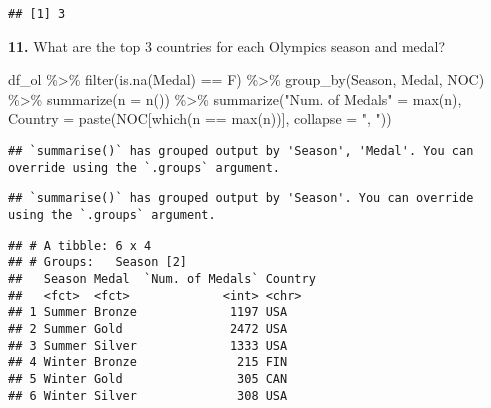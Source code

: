 \documentclass[
]{article}
\newenvironment{Shaded}{\begin{snugshade}}{\end{snugshade}}
\newcommand{\AttributeTok}[1]{\textcolor[rgb]{0.77,0.63,0.00}{#1}}
\newcommand{\FunctionTok}[1]{\textcolor[rgb]{0.00,0.00,0.00}{#1}}
\newcommand{\NormalTok}[1]{#1}
\newcommand{\OtherTok}[1]{\textcolor[rgb]{0.56,0.35,0.01}{#1}}
\newcommand{\SpecialCharTok}[1]{\textcolor[rgb]{0.00,0.00,0.00}{#1}}
\newcommand{\StringTok}[1]{\textcolor[rgb]{0.31,0.60,0.02}{#1}}
\begin{document}
\begin{verbatim}
## [1] 3
\end{verbatim}

\textbf{11. }What are the top 3 countries for each Olympics season and
medal?

\begin{Shaded}
\begin{Highlighting}[]
\NormalTok{df\_ol }\SpecialCharTok{\%\textgreater{}\%} \FunctionTok{filter}\NormalTok{(}\FunctionTok{is.na}\NormalTok{(Medal) }\SpecialCharTok{==}\NormalTok{ F) }\SpecialCharTok{\%\textgreater{}\%} 
  \FunctionTok{group\_by}\NormalTok{(Season, Medal, NOC) }\SpecialCharTok{\%\textgreater{}\%} 
  \FunctionTok{summarize}\NormalTok{(}\AttributeTok{n =} \FunctionTok{n}\NormalTok{()) }\SpecialCharTok{\%\textgreater{}\%} 
  \FunctionTok{summarize}\NormalTok{(}\StringTok{"Num. of Medals"} \OtherTok{=} \FunctionTok{max}\NormalTok{(n), }\AttributeTok{Country =} \FunctionTok{paste}\NormalTok{(NOC[}\FunctionTok{which}\NormalTok{(n }\SpecialCharTok{==} \FunctionTok{max}\NormalTok{(n))], }\AttributeTok{collapse =} \StringTok{", "}\NormalTok{))}
\end{Highlighting}
\end{Shaded}

\begin{verbatim}
## `summarise()` has grouped output by 'Season', 'Medal'. You can override using the `.groups` argument.
\end{verbatim}

\begin{verbatim}
## `summarise()` has grouped output by 'Season'. You can override using the `.groups` argument.
\end{verbatim}

\begin{verbatim}
## # A tibble: 6 x 4
## # Groups:   Season [2]
##   Season Medal  `Num. of Medals` Country
##   <fct>  <fct>             <int> <chr>  
## 1 Summer Bronze             1197 USA    
## 2 Summer Gold               2472 USA    
## 3 Summer Silver             1333 USA    
## 4 Winter Bronze              215 FIN    
## 5 Winter Gold                305 CAN    
## 6 Winter Silver              308 USA
\end{verbatim}
\end{document}
